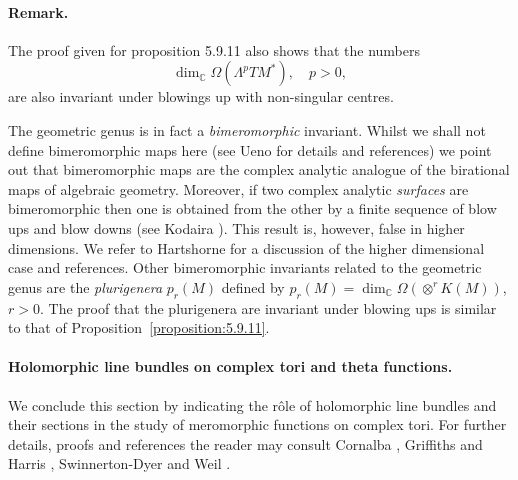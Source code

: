 \paragraph{Remark.} The proof given for proposition 5.9.11 also shows that the numbers
\[
\dim_{\mathbb C}\Omega(\Lambda^pTM^*),\quad p>0,
\]
are also invariant under blowings up with non-singular centres.

The geometric genus is in fact a \emph{bimeromorphic} invariant. Whilst we shall not define bimeromorphic maps here (see Ueno \cite{bib:II:ueno-k:1} for details and references) we point out that bimeromorphic maps are the complex analytic analogue of the birational maps of algebraic geometry. Moreover, if two complex analytic \emph{surfaces} are bimeromorphic then one is obtained from the other by a finite sequence of blow ups and
blow downs (see Kodaira \cite{bib:II:kodaira-k:1}). This result is, however, false in higher dimensions. We refer to Hartshorne \cite[pages 412--414]{bib:II:hartshorne-r:1} for a discussion of the higher dimensional case and references. Other bimeromorphic invariants related to the geometric genus are the \emph{plurigenera} $p_r(M)$ defined by $p_r(M)=\dim_{\mathbb C}\Omega(\otimes^rK(M))$, $r>0$. The proof that the plurigenera are invariant under blowing ups is similar to that of Proposition~\ref{proposition:5.9.11}.
\paragraph{Holomorphic line bundles on complex tori and theta functions.}
We conclude this section by indicating the r\^ole of holomorphic line bundles and their sections in the study of meromorphic functions on complex tori. For further details, proofs and references the reader may consult Cornalba \cite{bib:II:cornalba-m:1}, Griffiths and Harris \cite{bib:II:griffiths-p-and-harris-j:1}, Swinnerton-Dyer \cite{bib:II:swinnerton-dyer-h-p-f:1} and Weil \cite{bib:II:weil-a:1}.

